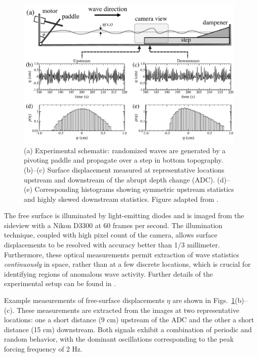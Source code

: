 \documentclass[11pt]{article}
\begin{document}
\begin{figure}%
\begin{center}
\includegraphics[width = 0.80 \linewidth]{Figs/ExpDiagStats.pdf}
\caption{
(a) Experimental schematic: randomized waves are generated by a pivoting paddle and propagate over a step in bottom topography.
(b)--(c) Surface displacement measured at representative locations upstream and downstream of the abrupt depth change (ADC). (d)--(e) Corresponding histograms showing symmetric upstream statistics and highly skewed downstream statistics. Figure adapted from \cite{bolles2019}.}
\label{ExpDiagStats}
\end{center}
\end{figure}
 
	The free surface is illuminated by light-emitting diodes and is imaged from the sideview with a Nikon D3300 at 60 frames per second. The illumination technique, coupled with high pixel count of the camera, allows surface displacements to be resolved with accuracy better than 1/3 millimeter. Furthermore, these optical measurements permit extraction of wave statistics {\em continuously} in space, rather than at a few discrete locations, which is crucial for identifying regions of anomalous wave activity. Further details of the experimental setup can be found in \cite{bolles2019}.

	Example measurements of free-surface displacements $\eta$ are shown in Figs.~\ref{ExpDiagStats}(b)--(c). These measurements are extracted from the images at two representative locations: one a short distance (9 cm) upstream of the ADC and the other a short distance (15 cm) downstream. Both signals exhibit a combination of periodic and random behavior, with the dominant oscillations corresponding to the peak forcing frequency of 2 Hz. 
	
\end{document}
